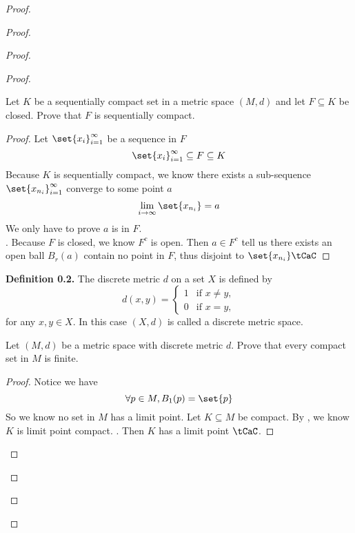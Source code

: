 \documentclass{report}
\begin{document}
\begin{proof}
\begin{proof}
\begin{proof}
\begin{proof}
\begin{question}{}{}
Let \( K \) be a sequentially compact set in a metric space \( (M, d) \) and let \( F \subseteq K \) be closed. Prove that \( F \) is sequentially compact.
\end{question}
\begin{proof}
Let $\set{x_i}_{i=1}^\infty$ be a sequence in $F$
\begin{equation*}
  \set{x_i}_{i=1}^\infty \subseteq F\subseteq K
\end{equation*}
Because $K$ is sequentially compact, we know there exists a sub-sequence $\set{x_{n_i}}_{i=1}^\infty$ converge to some point $a$
 \begin{equation*}
\lim_{i\to\infty}\set{x_{n_i}}=a
\end{equation*}
We only have to prove  $a$ is in  $F$.\\

. Because $F$ is closed, we know  $F^c$ is open. Then  $a\in F^c$ tell us there exists an open ball $B_r(a)$ contain no point in $F$, thus disjoint to  $\set{x_{n_i}}\tCaC$

\end{proof}
\textbf{Definition 0.2.} The discrete metric \( d \) on a set \( X \) is defined by
\[
d(x,y) = 
\begin{cases} 
1 & \text{if } x \neq y, \\
0 & \text{if } x = y,
\end{cases}
\]
for any \( x, y \in X \). In this case \( (X,d) \) is called a discrete metric space.
\begin{question}{}{}

Let \( (M, d) \) be a metric space with discrete metric \( d \). Prove that every compact set in \( M \) is finite.
\end{question}
\begin{proof}
Notice we have
\begin{equation*}
\forall p\in M, B_1(p)=\set{p}
\end{equation*}
So we know no set in $M$ has a limit point. Let $K\subseteq M$ be compact. By , we know $K$ is limit point compact. . Then $K$ has a limit point  $\tCaC$.
\end{proof}
\begin{question}{}{}


\end{question}
\end{proof}
\end{proof}
\end{proof}
\end{proof}
\end{document}
